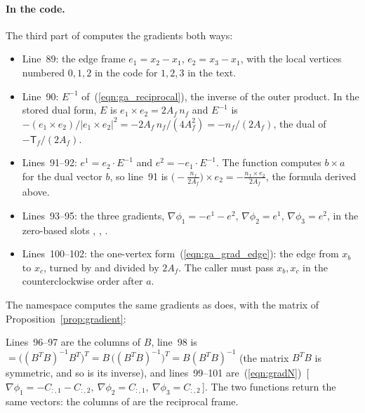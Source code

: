 \paragraph{In the code.} The third part of  computes the gradients both ways:

\begin{itemize}
\item Line~89: the edge frame $e_1 = x_2 - x_1$, $e_2 = x_3 - x_1$, with the local vertices numbered $0, 1, 2$ in the code for $1, 2, 3$ in the text.
\item Line~90: $E^{-1}$ of~(\ref{eqn:ga_reciprocal}), the inverse of the outer product. In the stored dual form, $E$ is $e_1\times e_2 = 2A_f\, n_f$ and $E^{-1}$ is $-(e_1\times e_2)/|e_1\times e_2|^2 = -2A_f\,n_f/(4A_f^2) = -n_f/(2A_f)$, the dual of $-\mathsf T_f/(2A_f)$.
\item Lines~91--92: $e^1 = e_2\cdot E^{-1}$ and $e^2 = -e_1\cdot E^{-1}$. The function  computes $b\times a$ for the dual vector $b$, so line~91 is $\big(-\frac{n_f}{2A_f}\big)\times e_2 = -\frac{n_f\times e_2}{2A_f}$, the formula derived above.
\item Lines~93--95: the three gradients, $\nabla\phi_1 = -e^1 - e^2$, $\nabla\phi_2 = e^1$, $\nabla\phi_3 = e^2$, in the zero-based slots , , .
\item Lines~100--102: the one-vertex form~(\ref{eqn:ga_grad_edge}): the edge from $x_b$ to $x_c$, turned by  and divided by $2A_f$. The caller must pass $x_b, x_c$ in the counterclockwise order after $a$.
\end{itemize}
The  namespace computes the same gradients as  does, with the matrix of Proposition~\ref{prop:gradient}:

Lines~96--97 are the columns of $B$, line~98 is  $= \big((B^TB)^{-1}B^T\big)^T = B\,\big((B^TB)^{-1}\big)^T = B(B^TB)^{-1}$ (the matrix $B^TB$ is symmetric, and so is its inverse), and lines~99--101 are~(\ref{eqn:gradN})~[\,$\nabla\phi_1 = -C_{:,1} - C_{:,2},\ \nabla\phi_2 = C_{:,1},\ \nabla\phi_3 = C_{:,2}$\,]. The two functions return the same vectors: the columns of  are the reciprocal frame.

